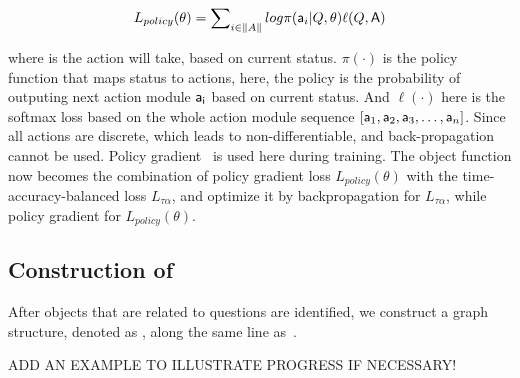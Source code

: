 \begin{small}
\begin{equation} 
    L_{policy}(\theta) = \sum\nolimits_{i\in\|A\|} log\pi({\mathsf{a}}_{i}|Q,\theta)\ell(Q,{\mathsf{A}})
\end{equation}
\end{small}

\noindent where  is the action will take, based on current status. $\pi(\cdot)$ is the policy function that maps status to actions, here, the policy is the probability of outputing next action module ${\mathsf{a_{i}}}$ based on current status. And $\ell(\cdot)$ here is the softmax loss based on the whole action module sequence $[{\mathsf{a}}_1,{\mathsf{a}}_2,{\mathsf{a}}_3,\dots,{\mathsf{a}}_n]$. Since all actions are discrete, which leads to non-differentiable, and back-propagation cannot be used. Policy gradient~\cite{Liu_2017_ICCV} is used here during training. The object function now becomes the combination of policy gradient loss $L_{policy}(\theta)$ with the time-accuracy-balanced loss $L_{\tau\alpha}$, and optimize it by backpropagation for $L_{\tau\alpha}$, while policy gradient for $L_{policy}(\theta)$.


\subsection{Construction of }
\label{sec-eag-construction}

After objects that are related to questions are identified, we construct a graph structure, denoted as , along the same line as~\cite{peixi2019}. 


\begin{example}
\label{exm-x1}
ADD AN EXAMPLE TO ILLUSTRATE PROGRESS IF NECESSARY!
\end{example}
